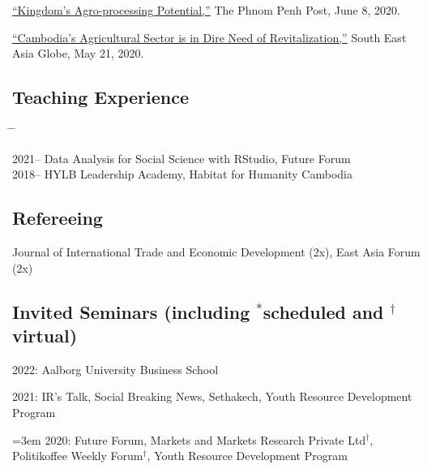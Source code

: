 \documentclass[10pt,a4paper]{article}
\newcommand{\tabbedblock}[1]{

	\begin{tabbing}
		\hspace{3cm} \= \hspace{4cm} \= \kill
		#1
	\end{tabbing}
}
\begin{document}
	\href{https://www.phnompenhpost.com/opinion/kingdoms-agro-processing-potential}{``Kingdom’s Agro-processing Potential,''} The Phnom Penh Post, June 8, 2020.\\  \vspace{-.5em}

	 \href{https://southeastasiaglobe.com/cambodias-agricultural-sector-is-one-in-dire-need-of-revitalising}{``Cambodia’s Agricultural Sector is in Dire Need of Revitalization,''} South East Asia Globe, May 21, 2020. 

\subsection*{Teaching Experience}

\tabbedblock{
	2021-- \> Data Analysis for Social Science with RStudio, Future Forum\\
	
	2018-- \> HYLB Leadership Academy, Habitat for Humanity Cambodia
}

\subsection*{Refereeing}
	
	Journal of International Trade and Economic Development (2x), East Asia Forum (2x)

\subsection*{Invited Seminars (including $^\ast$scheduled and $^\dag$virtual)}

	2022: Aalborg University Business School

	2021: IR’s Talk, Social Breaking News, Sethakech, Youth Resource Development Program
				
\hangindent=3em
	2020: Future Forum, Markets and Markets Research Private Ltd$^\dag$, Politikoffee Weekly Forum$^\dag$, Youth Resource Development Program
\end{document}
